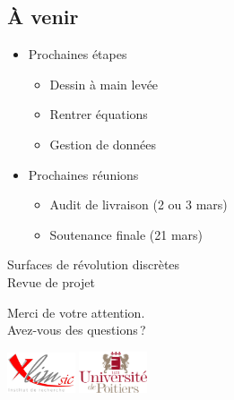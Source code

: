 \documentclass[xcolor=dvipsnames]{beamer}
\begin{document}
	\subsection{\`A venir}
	\begin{frame}{\secname}
		\begin{itemize}
			\item Prochaines \'etapes
			\begin{itemize}
				\item Dessin à main lev\'ee
				\item Rentrer \'equations
				\item Gestion de donn\'ees
			\end{itemize}
		\end{itemize}
		\begin{itemize}
			\item Prochaines r\'eunions
			\begin{itemize}
				\item Audit de livraison (2 ou 3 mars)
				\item Soutenance finale (21 mars)
			\end{itemize}
		\end{itemize}
	\end{frame}




\begin{frame}{}
	\bigskip
	\bigskip
	\begin{titleblock}{}
		\begin{center}
			\smallskip
			\Large Surfaces de r\'evolution discr\`etes\\
			\medskip
			\small Revue de projet
			\smallskip
		\end{center}
	\end{titleblock}

	\bigskip
	\begin{center}
		Merci de votre attention.\\
		\medskip
		Avez-vous des questions\,?			
	\end{center}

	\bigskip
	\bigskip
	\includegraphics[width=2cm]{../Images/logo-Xlim.png}
	\hfill
	\includegraphics[width=2cm]{../Images/logo_univ_poitiers.png}
\end{frame}
\end{document}
